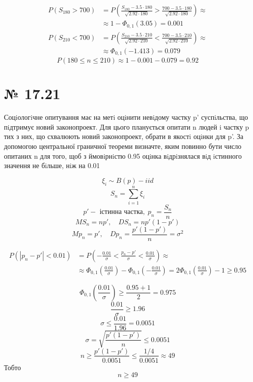 \documentclass[11pt, a4paper]{article} %
\begin{document}
\begin{align*}
    P(S_{180}>700) &= P\left(\frac{S_{180} - 3.5 \cdot 180}{\sqrt{2.92 \cdot 180}} > \frac{700 - 3.5 \cdot 180}{\sqrt{2.92 \cdot 180}} \right) \approx \\
    &\approx 1 - \Phi_{0,1}(3.05) = 0.001
\end{align*}
\begin{align*}
    P(S_{210}<700) &= P\left(\frac{S_{210} - 3.5 \cdot 210}{\sqrt{2.92 \cdot 210}} < \frac{700 - 3.5 \cdot 210}{\sqrt{2.92 \cdot 210}} \right) \approx \\
    &\approx \Phi_{0,1}(-1.413) = 0.079
\end{align*}
\[P(180 \le n \le 210) \approx 1 - 0.001 - 0.079 = 0.92\]

\section*{№ 17.21}
\begin{mdframed}
    Соцiологiчне опитування має на метi оцiнити невiдому частку p' суспiльства, 
    що пiдтримує новий законопроект. Для цього планується опитати n людей i частку 
    p тих з них, що схвалюють новий законопроект, обрати в якостi оцiнки для p'. За 
    допомогою центральної граничної теореми визначте, яким повинно бути число 
    опитаних n для того, щоб з ймовiрнiстю 0.95 оцiнка вiдрiзнялася вiд iстинного 
    значення не бiльше, нiж на 0.01
\end{mdframed}

\[\xi_i \sim B(p) - iid\]
\[S_n = \sum_{i=1}^n \xi_i\]
\[p' - \text{ істинна частка},\; p_n = \frac{S_n}{n}\]
\[MS_n = np',\quad DS_n = np'(1-p')\]
\[Mp_n = p',\quad Dp_n = \frac{p'(1-p')}{n} = \sigma^2\]

\begin{align*}
    P(|p_n-p'| < 0.01) &= P\left(-\frac{0.01}{\sigma} < \frac{p_n - p'}{\sigma} < \frac{0.01}{\sigma}\right) \approx \\
    &\approx \Phi_{0,1}\left(\frac{0.01}{\sigma}\right) - \Phi_{0,1}\left(-\frac{0.01}{\sigma}\right) = 2\Phi_{0,1}\left(\frac{0.01}{\sigma}\right) - 1 \ge 0.95
\end{align*}

\[\Phi_{0,1}\left(\frac{0.01}{\sigma}\right) \ge \frac{0.95 + 1}{2} = 0.975\]
\[\frac{0.01}{\sigma} \ge 1.96\]
\[\sigma \le \frac{0.01}{1.96} = 0.0051\]
\[\sigma = \sqrt{\frac{p'(1-p')}{n}} \le 0.0051\]
\[n \ge \frac{p'(1-p')}{0.0051} \le \frac{1/4}{0.0051} \approx 49\]
Тобто
\[\boxed{n \ge 49}\]
\end{document}
